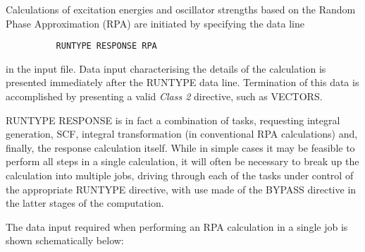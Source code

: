 \documentclass[11pt,fleqn]{article}
\begin{document}
Calculations of excitation energies and oscillator strengths
based on the Random Phase Approximation (RPA) are initiated
by specifying the data line

{
\footnotesize
\begin{verbatim}
          RUNTYPE RESPONSE RPA
\end{verbatim}
}
in the input file. Data input characterising the details of 
the calculation is presented immediately after the RUNTYPE data 
line. Termination of this data is accomplished by presenting
a valid {\em Class 2} directive, such as VECTORS.

RUNTYPE RESPONSE is in fact a combination of tasks, requesting
integral generation, SCF, integral transformation (in conventional
RPA calculations) and, finally, the response calculation itself. 
While in simple cases it may be feasible to perform all steps 
in a single calculation, it will often be necessary to break up the 
calculation into multiple jobs, driving through each of the tasks under
control of the appropriate RUNTYPE directive, with use made
of the BYPASS directive in the latter stages of the computation.

The data input required when performing an RPA calculation 
in a single job is shown schematically below:
\end{document}
